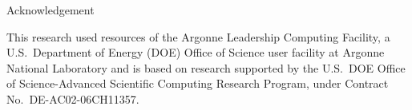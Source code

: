 \documentclass[aspectratio=169,11pt]{beamer}
\begin{document}
\begin{frame}[plain]{Acknowledgement}
  \vfill
  \begin{center}
  \begin{minipage}{0.85\textwidth}
    \small
    This research used resources of the Argonne Leadership Computing
    Facility, a U.S.\ Department of Energy (DOE) Office of Science user
    facility at Argonne National Laboratory and is based on research
    supported by the U.S.\ DOE Office of Science-Advanced Scientific
    Computing Research Program, under Contract No.\ DE-AC02-06CH11357.
  \end{minipage}
  \end{center}
  \vfill
\end{frame}
\end{document}

